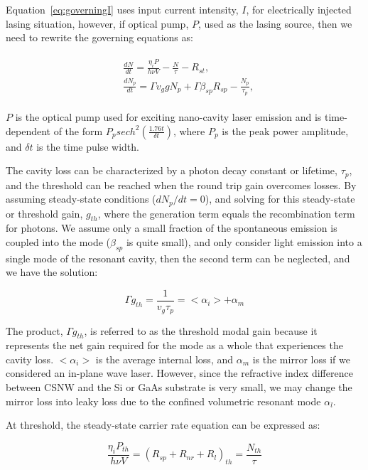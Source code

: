 Equation~\ref{eq:governingI} uses input current intensity, $I$, for
electrically injected lasing situation, however, if optical pump, $P$, used as
the lasing source, then we need to rewrite the governing equations as:

\begin{eqnarray}
\begin{aligned}
  & \frac{dN}{dt} = \frac{\eta_{i}P}{h\nu{V}} - \frac{N}{\tau} - R_{st},
  \\
  & \frac{dN_p}{dt} = {\Gamma}v_g{g}N_p + \Gamma\beta_{sp}R_{sp} - \frac{N_p}{\tau_p},
\end{aligned}
\label{eq:governingP}
\end{eqnarray}

$P$ is the optical pump used for exciting nano-cavity laser emission and is
time-dependent of the form $P_{p}sech^2(\frac{1.76t}{\delta{t}})$, where $P_p$
is the peak power amplitude, and $\delta{t}$ is the time pulse width.

The cavity loss can be characterized by a photon decay constant or lifetime,
$\tau_p$, and the threshold can be reached when the round trip gain overcomes
losses.  By assuming steady-state conditions (\ie $dN_p/dt = 0$), and solving
for this steady-state or threshold gain, $g_{th}$, where the generation term
equals the recombination term for photons. We assume only a small fraction of
the spontaneous emission is coupled into the mode (\ie $\beta_{sp}$ is quite
small), and only consider light emission into a single mode of the resonant
cavity, then the second term can be neglected, and we have the solution:

\begin{equation}
  \Gamma{g_{th}} = \frac{1}{v_g\tau_p} = <\alpha_i> + \alpha_m
\end{equation}

The product, $\Gamma{g_{th}}$, is referred to as the threshold modal gain
because it represents the net gain required for the mode as a whole that
experiences the cavity loss. $<\alpha_i>$ is the average internal loss, and
$\alpha_m$ is the mirror loss if we considered an in-plane wave laser. However,
since the refractive index difference between CSNW and the Si or GaAs substrate
is very small, we may change the mirror loss into leaky loss due to the
confined volumetric resonant mode $\alpha_l$.

At threshold, the steady-state carrier rate equation can be expressed as:

\begin{equation}
  \frac{\eta_{i}P_{th}}{h\nu{V}} = {(R_{sp} + R_{nr} + R_{l})}_{th}=\frac{N_{th}}{\tau}
  \label{eq:steadyrate}
\end{equation}

